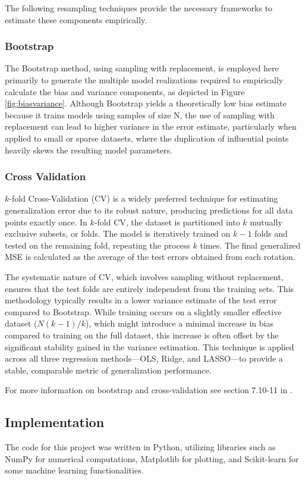 \documentclass[twocolumn,aps]{revtex4}
\begin{document}
The following resampling techniques provide the necessary frameworks to estimate these components empirically.

\subsubsection{Bootstrap}
The Bootstrap method, using sampling with replacement, is employed here primarily to generate the multiple model realizations required to empirically calculate the bias and variance components, as depicted in Figure \ref{fig:biasvariance}. 
Although Bootstrap yields a theoretically low bias estimate because it trains models using samples of size N, the use of sampling with replacement can lead to higher variance in the error estimate, particularly when applied to small or sparse datasets, where the duplication of influential points heavily skews the resulting model parameters.

\subsubsection{Cross Validation}
$k$-fold Cross-Validation (CV) is a widely preferred technique for estimating generalization error due to its robust nature, producing predictions for all data points exactly once.
In $k$-fold CV, the dataset is partitioned into $k$ mutually exclusive subsets, or folds. 
The model is iteratively trained on $k-1$ folds and tested on the remaining fold, repeating the process $k$ times. 
The final generalized MSE is calculated as the average of the test errors obtained from each rotation.

The systematic nature of CV, which involves sampling without replacement, ensures that the test folds are entirely independent from the training sets. 
This methodology typically results in a lower variance estimate of the test error compared to Bootstrap. 
While training occurs on a slightly smaller effective dataset ($N(k-1)/k$), which might introduce a minimal increase in bias compared to training on the full dataset, this increase is often offset by the significant stability gained in the variance estimation. 
This technique is applied across all three regression methods—OLS, Ridge, and LASSO—to provide a stable, comparable metric of generalization performance.

For more information on bootstrap and cross-validation see section 7.10-11 in \citet{hastie}.


\subsection{Implementation}
The code for this project was written in Python, utilizing libraries such as NumPy for numerical computations, Matplotlib for plotting, and Scikit-learn for some machine learning functionalities.
\end{document}
